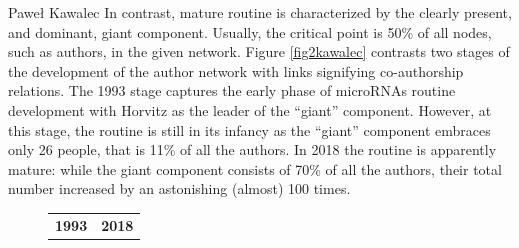 \begin{artengenv}{Paweł Kawalec}
In contrast, mature routine is characterized by the clearly present, and dominant, giant component. Usually, the critical point is 50\% of all nodes, such as authors, in the given network. Figure \ref{fig2kawalec} contrasts two stages of the development of the author network with links signifying co-authorship relations. The 1993 stage captures the early phase of microRNAs routine development with Horvitz as the leader of the ``giant'' component. However, at this stage, the routine is still in its infancy as the ``giant'' component embraces only 26 people, that is 11\% of all the authors. In 2018 the routine is apparently mature: while the giant component consists of 70\% of all the authors, their total number increased by an astonishing (almost) 100 times.

\begin{figure}[h!]
\begin{flushleft}
\tablefirsthead{}
\tablehead{}
\tabletail{}
\tablelasttail{}
\begin{tabular}{m{.5\linewidth}|m{.5\linewidth}}
{\centering\bfseries 1993\par}

 &
{\centering\bfseries 2018\par}


\end{tabular}
\end{flushleft}
\end{figure}
\end{artengenv}
